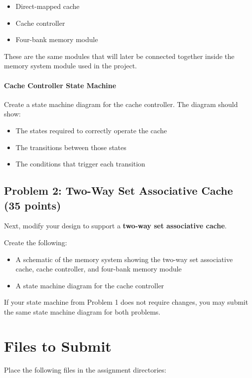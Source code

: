 \documentclass[12pt]{article}
\begin{document}
\begin{itemize}
\item Direct-mapped cache
\item Cache controller
\item Four-bank memory module
\end{itemize}

These are the same modules that will later be connected together inside the memory system module used in the project.

\paragraph{Cache Controller State Machine}

Create a state machine diagram for the cache controller.
The diagram should show:

\begin{itemize}
\item The states required to correctly operate the cache
\item The transitions between those states
\item The conditions that trigger each transition
\end{itemize}

\subsection*{Problem 2: Two-Way Set Associative Cache (35 points)}

Next, modify your design to support a \textbf{two-way set associative cache}.

Create the following:

\begin{itemize}
\item A schematic of the memory system showing the two-way set associative cache, cache controller, and four-bank memory module
\item A state machine diagram for the cache controller
\end{itemize}

If your state machine from Problem 1 does not require changes, you may submit the same state machine diagram for both problems.

\section*{Files to Submit}

Place the following files in the assignment directories:
\end{document}
